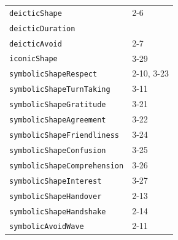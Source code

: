 \documentclass{CSSRforAfrica}
\begin{document}
\begin{table}[H]
\begin{center}
\begin{tabular}{|l l|}
{\footnotesize \verb+deicticShape+} 	                 & {\footnotesize 2-6} \vspace{-1.01mm}\\
{\footnotesize \verb+deicticDuration+} 	                 & {\footnotesize \verb++} \vspace{-1.01mm}\\
{\footnotesize \verb+deicticAvoid+} 	          & {\footnotesize 2-7} \vspace{-1.01mm}\\
{\footnotesize \verb+iconicShape+} 	                 & {\footnotesize 3-29} \vspace{-1.01mm}\\
{\footnotesize \verb+symbolicShapeRespect+} 	                 & {\footnotesize 2-10, 3-23 }\vspace{-1.01mm} \\
{\footnotesize \verb+symbolicShapeTurnTaking+} 	                 & {\footnotesize 3-11  }\vspace{-1.01mm} \\
{\footnotesize \verb+symbolicShapeGratitude+} 	                 & {\footnotesize 3-21 }\vspace{-1.01mm} \\
{\footnotesize \verb+symbolicShapeAgreement+} 	                 & {\footnotesize 3-22 }\vspace{-1.01mm} \\
{\footnotesize \verb+symbolicShapeFriendliness+} 	                 & {\footnotesize 3-24 }\vspace{-1.01mm} \\
{\footnotesize \verb+symbolicShapeConfusion+} 	                 & {\footnotesize  3-25}\vspace{-1.01mm} \\
{\footnotesize \verb+symbolicShapeComprehension+} 	                 & {\footnotesize 3-26 }\vspace{-1.01mm} \\
{\footnotesize \verb+symbolicShapeInterest+} 	                 & {\footnotesize 3-27 }\vspace{-1.01mm} \\
{\footnotesize \verb+symbolicShapeHandover+} 	                 & {\footnotesize  2-13}\vspace{-1.01mm} \\
{\footnotesize \verb+symbolicShapeHandshake+} 	                 & {\footnotesize   2-14  }\vspace{-1.01mm} \\
{\footnotesize \verb+symbolicAvoidWave+} 	  & {\footnotesize 2-11 }\vspace{-1.01mm} \\

\end{tabular}
\end{center}
\end{table}
\end{document}
